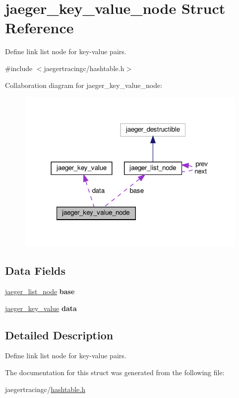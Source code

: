 \hypertarget{structjaeger__key__value__node}{}\section{jaeger\+\_\+key\+\_\+value\+\_\+node Struct Reference}
\label{structjaeger__key__value__node}


Define link list node for key-\/value pairs.  




{\ttfamily \#include $<$jaegertracingc/hashtable.\+h$>$}



Collaboration diagram for jaeger\+\_\+key\+\_\+value\+\_\+node\+:\nopagebreak
\begin{figure}[H]
\begin{center}
\leavevmode
\includegraphics[width=318pt]{structjaeger__key__value__node__coll__graph}
\end{center}
\end{figure}
\subsection*{Data Fields}
\begin{DoxyCompactItemize}
\item 
\mbox{\label{structjaeger__key__value__node_a590784cfceafeb3ec9ec12c9b67e6867}} 
\mbox{\hyperlink{structjaeger__list__node}{jaeger\+\_\+list\+\_\+node}} {\bfseries base}
\item 
\mbox{\label{structjaeger__key__value__node_a28ce993b369e2e969d524d7c65db2f9f}} 
\mbox{\hyperlink{structjaeger__key__value}{jaeger\+\_\+key\+\_\+value}} {\bfseries data}
\end{DoxyCompactItemize}


\subsection{Detailed Description}
Define link list node for key-\/value pairs. 



The documentation for this struct was generated from the following file\+:\begin{DoxyCompactItemize}
\item 
jaegertracingc/\mbox{\hyperlink{hashtable_8h}{hashtable.\+h}}\end{DoxyCompactItemize}
